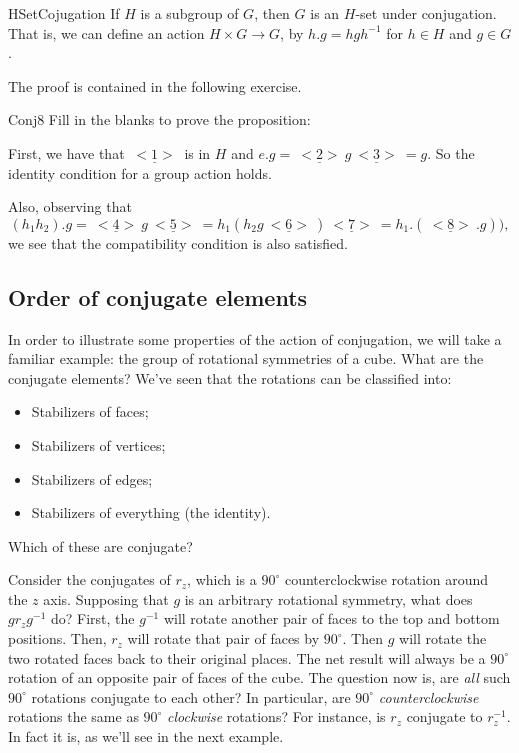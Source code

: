 \begin{prop}{HSetCojugation} If $H$ is a subgroup of $G$, then $G$ is an $H$-set under conjugation.  That is, we can define an action $H \times G\rightarrow G$, by $h.g=hgh^{-1}$ for $h\in H$ and $g\in G$. 
\end{prop}
The proof is contained in the following exercise.

\begin{exercise}{Conj8}
Fill in the blanks to prove the proposition:

\noindent
First, we have that $\underline{~<1>~}$ is in  $H$ and $e.g=\underline{~<2>~}g\underline{~<3>~} = g$.
So the identity condition for a group action holds. 

Also, observing that
\[(h_1h_2).g =\underline{~<4>~}g\underline{~<5>~}
= h_1(h_2g\underline{~<6>~} )\underline{~<7>~}
= h_1. (\underline{~<8>~}. g)),\]
we see that the compatibility condition is also satisfied.
\end{exercise}

\subsection{Order of conjugate elements}

In order to illustrate some properties of the action of conjugation, we will take a familiar example: the group of rotational symmetries of a cube.
What are the conjugate elements?
We've seen that the rotations can be classified into:
\begin{itemize}
\item
Stabilizers of faces;
\item
Stabilizers of vertices;
\item
Stabilizers of edges;
\item
Stabilizers of everything (the identity).
\end{itemize}
Which of these are conjugate? 


Consider the conjugates of $r_z$, which is a  $90^{\circ}$ counterclockwise rotation around the $z$ axis. Supposing that $g$ is an arbitrary rotational symmetry, what does $g r_z g^{-1}$ do? First, the $g^{-1}$ will rotate another pair of faces to the top and bottom positions. Then, $r_z$ will rotate that pair of faces by  $90^{\circ}$. Then $g$ will rotate the two rotated faces back to their original places. The net result will always be a  $90^{\circ}$ rotation of an opposite pair of faces of the cube. 
The question now is, are \emph{all} such  $90^{\circ}$ rotations conjugate to each other? In particular, are  $90^{\circ}$ \emph{counterclockwise} rotations the same as  $90^{\circ}$ \emph{clockwise} rotations? For instance, is $r_z$ conjugate to $r_z^{-1}$.  In fact it is, as we'll see in the next example.

